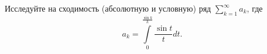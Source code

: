 \documentclass{article}
\begin{document}
Исследуйте на сходимость (абсолютную и условную) ряд $\sum_{k=1}^\infty a_k$, где
$$a_k = \int\limits_0^{\frac{\sin k}{k}} \frac{\sin t}{t} dt.$$
\end{document}
